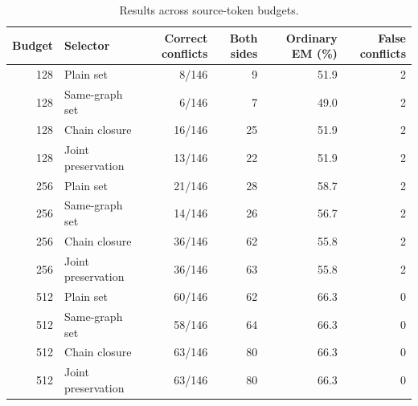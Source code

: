 \begin{table}[pos=H]
\caption{Results across source-token budgets.}\label{tab:budget}
\centering\small
\setlength{\tabcolsep}{6pt}
\begin{tabular}{rlrrrr}
\toprule
Budget & Selector & Correct conflicts & Both sides & Ordinary EM (\%) & False conflicts \\
\midrule
128 & Plain set & 8/146 & 9 & 51.9 & 2 \\
128 & Same-graph set & 6/146 & 7 & 49.0 & 2 \\
128 & Chain closure & 16/146 & 25 & 51.9 & 2 \\
128 & Joint preservation & 13/146 & 22 & 51.9 & 2 \\
256 & Plain set & 21/146 & 28 & 58.7 & 2 \\
256 & Same-graph set & 14/146 & 26 & 56.7 & 2 \\
256 & Chain closure & 36/146 & 62 & 55.8 & 2 \\
256 & Joint preservation & 36/146 & 63 & 55.8 & 2 \\
512 & Plain set & 60/146 & 62 & 66.3 & 0 \\
512 & Same-graph set & 58/146 & 64 & 66.3 & 0 \\
512 & Chain closure & 63/146 & 80 & 66.3 & 0 \\
512 & Joint preservation & 63/146 & 80 & 66.3 & 0 \\
\bottomrule
\end{tabular}
\end{table}
